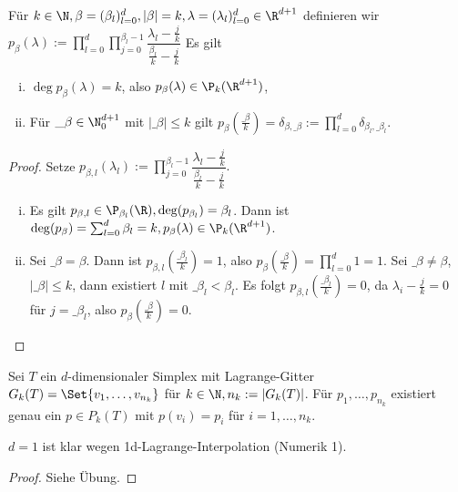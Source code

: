 
\begin{lem} \label{3.68}
	Für $k \in \N, \beta = (\beta_l)_{l=0}^d, |\beta| = k, \lambda = (\lambda_l)_{l=0}^d \in \R^{d+1}$ definieren wir
	\begin{math}
		p_\beta(\lambda)
		:= \prod_{l=0}^d \prod_{j=0}^{\beta_l - 1} \dfrac{\lambda_l - \frac{j}{k}}{\frac{\beta_l}{k} - \frac{j}{k}}
	\end{math}
	Es gilt
	\begin{enumerate}[i)]
		\item
			$\deg p_\beta(\lambda) = k$, also $p_\beta(\lambda) \in \P_k(\R^{d+1})$,
		\item
			Für $\_\beta \in \N_0^{d+1}$ mit $|\_\beta| \le k$ gilt $p_\beta(\frac{\_\beta}{k}) = \delta_{\beta,\_\beta} := \prod_{l = 0}^d \delta_{\beta_l, \_\beta_l}$.
	\end{enumerate}
	\begin{proof}
		Setze
		\begin{math}
			p_{\beta,l}(\lambda_l) := \prod_{j=0}^{\beta_l - 1} \dfrac{\lambda_l - \frac{j}{k}}{\frac{\beta_l}{k}-\frac{j}{k}}.
		\end{math}
		\begin{enumerate}[i)]
			\item
				Es gilt $p_{\beta,l} \in \P_{\beta_l}(\R), \deg(p_{\beta_l}) = \beta_l$.
				Dann ist $\deg(p_\beta) = \sum_{l=0}^d \beta_l = k, p_\beta(\lambda) \in \P_k(\R^{d+1})$.
			\item
				Sei $\_\beta = \beta$.
				Dann ist $p_{\beta,l}(\frac{\_\beta_l}{k}) = 1$, also $p_\beta(\frac{\_\beta}{k}) = \prod_{l=0}^d 1 = 1$.
				Sei $\_\beta \neq \beta$, $|\_\beta| \le k$, dann existiert $l$ mit $\_\beta_l < \beta_l$.
				Es folgt $p_{\beta, l}(\frac{\_\beta_l}{k}) = 0$, da $\lambda_i - \frac{j}{k} = 0$ für $j = \_\beta_l$, also $p_\beta(\frac{\_\beta}{k}) = 0$.
		\end{enumerate}
	\end{proof}
\end{lem}

\begin{st} \label{3.69}
	Sei $T$ ein $d$-dimensionaler Simplex mit Lagrange-Gitter $G_k(T) = \Set{v_1, \dotsc, v_{n_k}}$ für $k \in \N, n_k := |G_k(T)|$.
	Für $p_1, \dotsc, p_{n_k}$ existiert genau ein $p \in P_k(T)$ mit $p(v_i) = p_i$ für $i = 1, \dotsc, n_k$.
	\begin{note}
		$d = 1$ ist klar wegen 1d-Lagrange-Interpolation (Numerik 1).
	\end{note}
	\begin{proof}
		Siehe Übung.
	\end{proof}
\end{st}

